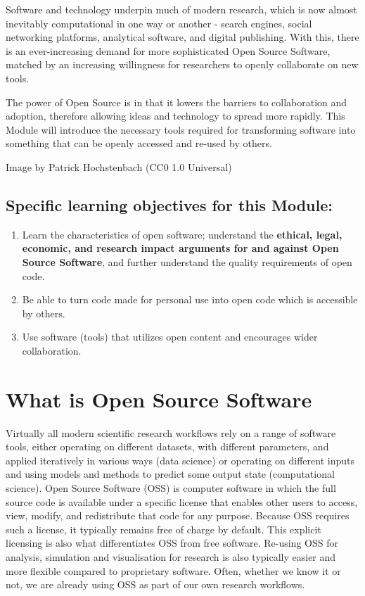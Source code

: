 \documentclass[]{book}
\begin{document}
Software and technology underpin much of modern research, which is now almost inevitably computational in one way or another - search engines, social networking platforms, analytical software, and digital publishing. With this, there is an ever-increasing demand for more sophisticated Open Source Software, matched by an increasing willingness for researchers to openly collaborate on new tools.

The power of Open Source is in that it lowers the barriers to collaboration and adoption, therefore allowing ideas and technology to spread more rapidly. This Module will introduce the necessary tools required for transforming software into something that can be openly accessed and re-used by others.

Image by Patrick Hochstenbach (CC0 1.0 Universal)

\hypertarget{specific-learning-objectives-for-this-module-1}{%
\subsection{\texorpdfstring{\textbf{Specific learning objectives for this Module}:}{Specific learning objectives for this Module:}}\label{specific-learning-objectives-for-this-module-1}}

\begin{enumerate}
\def\labelenumi{\arabic{enumi}.}
\item
  Learn the characteristics of open software; understand the \textbf{ethical, legal, economic, and research impact arguments for and against Open Source Software}, and further understand the quality requirements of open code.
\item
  Be able to turn code made for personal use into open code which is accessible by others.
\item
  Use software (tools) that utilizes open content and encourages wider collaboration.
\end{enumerate}

\hypertarget{what-is-open-source-software}{%
\section{What is Open Source Software }\label{what-is-open-source-software}}

Virtually all modern scientific research workflows rely on a range of software tools, either operating on different datasets, with different parameters, and applied iteratively in various ways (data science) or operating on different inputs and using models and methods to predict some output state (computational science). Open Source Software (OSS) is computer software in which the full source code is available under a specific license that enables other users to access, view, modify, and redistribute that code for any purpose. Because OSS requires such a license, it typically remains free of charge by default. This explicit licensing is also what differentiates OSS from free software. Re-using OSS for analysis, simulation and visualisation for research is also typically easier and more flexible compared to proprietary software. Often, whether we know it or not, we are already using OSS as part of our own research workflows.
\end{document}
